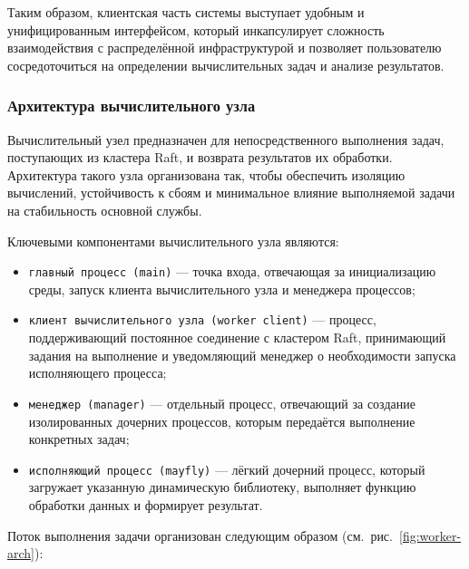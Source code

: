 Таким образом, клиентская часть системы выступает удобным и
унифицированным интерфейсом, который инкапсулирует сложность
взаимодействия с распределённой инфраструктурой и позволяет
пользователю сосредоточиться на определении вычислительных задач и
анализе результатов.

\subsubsection{Архитектура вычислительного узла}

Вычислительный узел предназначен для непосредственного выполнения
задач, поступающих из кластера Raft, и возврата результатов их
обработки. Архитектура такого узла организована так, чтобы обеспечить
изоляцию вычислений, устойчивость к сбоям и минимальное влияние
выполняемой задачи на стабильность основной службы.

Ключевыми компонентами вычислительного узла являются:
\begin{itemize}
    \item \texttt{главный процесс (main)} --- точка входа, отвечающая
    за инициализацию среды, запуск клиента вычислительного узла и
    менеджера процессов;
    \item \texttt{клиент вычислительного узла (worker client)} ---
    процесс, поддерживающий постоянное соединение с кластером Raft,
    принимающий задания на выполнение и уведомляющий менеджер о
    необходимости запуска исполняющего процесса;
    \item \texttt{менеджер (manager)} --- отдельный процесс,
    отвечающий за создание изолированных дочерних процессов, которым
    передаётся выполнение конкретных задач;
    \item \texttt{исполняющий процесс (mayfly)} --- лёгкий дочерний
    процесс, который загружает указанную динамическую библиотеку,
    выполняет функцию обработки данных и формирует результат.
\end{itemize}

Поток выполнения задачи организован следующим образом
(см.~рис.~\ref{fig:worker-arch}):

